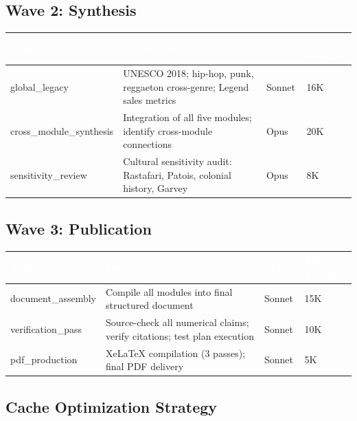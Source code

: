 \documentclass[11pt,letterpaper]{article}
\newcommand{\tableheader}[1]{\textbf{\sffamily\textcolor{white}{#1}}}
\begin{document}
\subsection{Wave 2: Synthesis}

\begin{center}
\begin{tabularx}{\textwidth}{L{3.5cm}XC{1.5cm}C{2cm}}
\toprule
{}
\tableheader{Task} & \tableheader{Description} & \tableheader{Model} & \tableheader{Est. Tokens} \\
\midrule
global\_legacy & UNESCO 2018; hip-hop, punk, reggaeton cross-genre; Legend sales metrics & Sonnet & 16K \\
cross\_module\_synthesis & Integration of all five modules; identify cross-module connections & Opus & 20K \\
sensitivity\_review & Cultural sensitivity audit: Rastafari, Patois, colonial history, Garvey & Opus & 8K \\
\bottomrule
\end{tabularx}
\end{center}

\subsection{Wave 3: Publication}

\begin{center}
\begin{tabularx}{\textwidth}{L{3.5cm}XC{1.5cm}C{2cm}}
\toprule
{}
\tableheader{Task} & \tableheader{Description} & \tableheader{Model} & \tableheader{Est. Tokens} \\
\midrule
document\_assembly & Compile all modules into final structured document & Sonnet & 15K \\
verification\_pass & Source-check all numerical claims; verify citations; test plan execution & Sonnet & 10K \\
pdf\_production & XeLaTeX compilation (3 passes); final PDF delivery & Sonnet & 5K \\
\bottomrule
\end{tabularx}
\end{center}

\subsection{Cache Optimization Strategy}
\end{document}

